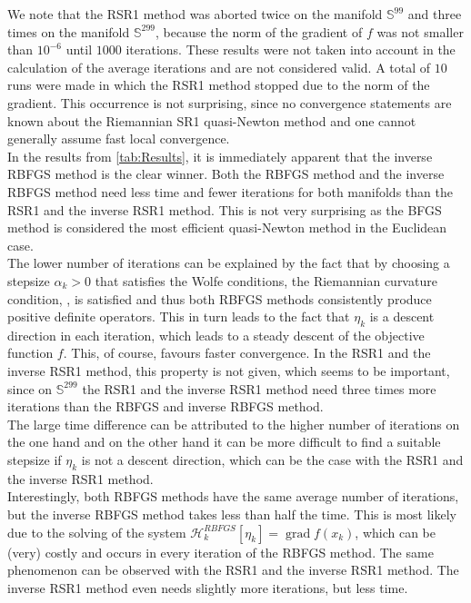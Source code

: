 We note that the RSR1 method was aborted twice on the manifold $\mathbb{S}^{99}$ and three times on the manifold $\mathbb{S}^{299}$, because the norm of the gradient of $f$ was not smaller than $10^{-6}$ until $1000$ iterations. These results were not taken into account in the calculation of the average iterations and are not considered valid. A total of $10$ runs were made in which the RSR1 method stopped due to the norm of the gradient. This occurrence is not surprising, since no convergence statements are known about the Riemannian SR1 quasi-Newton method and one cannot generally assume fast local convergence. \\
In the results from \cref{tab:Results}, it is immediately apparent that the inverse RBFGS method is the clear winner. Both the RBFGS method and the inverse RBFGS method need less time and fewer iterations for both manifolds than the RSR1 and the inverse RSR1 method. This is not very surprising as the BFGS method is considered the most efficient quasi-Newton method in the Euclidean case. \\
The lower number of iterations can be explained by the fact that by choosing a stepsize $\alpha_k > 0$ that satisfies the Wolfe conditions, the Riemannian curvature condition, , is satisfied and thus both RBFGS methods consistently produce positive definite operators. This in turn leads to the fact that $\eta_k$ is a descent direction in each iteration, which leads to a steady descent of the objective function $f$. This, of course, favours faster convergence. In the RSR1 and the inverse RSR1 method, this property is not given, which seems to be important, since on $\mathbb{S}^{299}$ the RSR1 and the inverse RSR1 method need three times more iterations than the RBFGS and inverse RBFGS method. \\
The large time difference can be attributed to the higher number of iterations on the one hand and on the other hand it can be more difficult to find a suitable stepsize if $\eta_k$ is not a descent direction, which can be the case with the RSR1 and the inverse RSR1 method. \\
Interestingly, both RBFGS methods have the same average number of iterations, but the inverse RBFGS method takes less than half the time. This is most likely due to the solving of the system $\mathcal{H}^{RBFGS}_k [\eta_k] = \operatorname{grad} f(x_k)$, which can be (very) costly and occurs in every iteration of the RBFGS method. The same phenomenon can be observed with the RSR1 and the inverse RSR1 method. The inverse RSR1 method even needs slightly more iterations, but less time.
